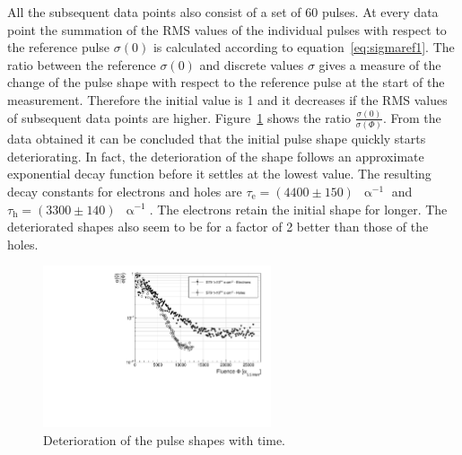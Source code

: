 All the subsequent data points also consist of a set of 60 pulses. At every data point the summation of the RMS values of the individual pulses with respect to the reference pulse $\sigma (0)$ is calculated according to equation~\ref{eq:sigmaref1}. The ratio between the reference $\sigma (0)$ and discrete values $\sigma$ gives a measure of the change of the pulse shape with respect to the reference pulse at the start of the measurement. Therefore the initial value is 1 and it decreases if the RMS values of subsequent data points are higher.
Figure~\ref{fig:longtermc2corr} shows the ratio $\frac{\sigma (0) }{\sigma(\Phi)}$. From the data obtained it can be concluded that the initial pulse shape quickly starts deteriorating. In fact, the deterioration of the shape follows an approximate exponential decay function before it settles at the lowest value. The resulting decay constants for electrons and holes are $\tau_{\mathrm{e}}=(4400\pm150)$~$\upalpha^{-1}$ and $\tau_{\mathrm{h}}=(3300\pm140)$~$\upalpha^{-1}$. The electrons retain the initial shape for longer. The deteriorated shapes also seem to be for a factor of 2 better than those of the holes. 

\begin{figure}[!t]
\begin{center}
\includegraphics[width=0.6\textwidth]{03_measurement_results/scripts/plots/plotLifetime/corrlifetime}
\caption{Deterioration of the pulse shapes with time.}
\label{fig:longtermc2corr}
\end{center}
\end{figure}


